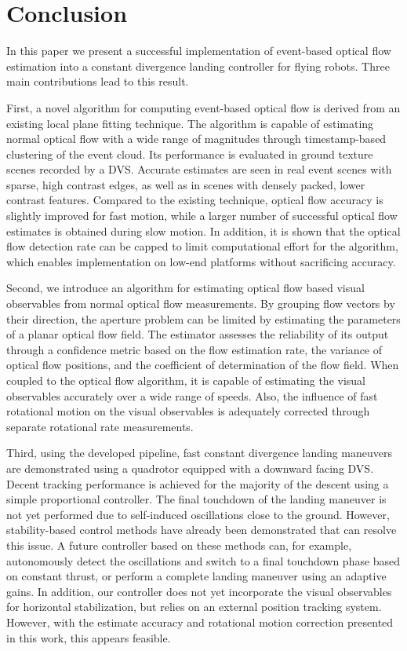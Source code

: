 \section{Conclusion}
\label{sec:conclusion}

In this paper we present a successful implementation of event-based optical flow estimation into a constant divergence landing controller for flying robots. Three main contributions lead to this result.

First, a novel algorithm for computing event-based optical flow is derived from an existing local plane fitting technique. The algorithm is capable of estimating normal optical flow with a wide range of magnitudes through timestamp-based clustering of the event cloud. Its performance is evaluated in ground texture scenes recorded by a DVS. Accurate estimates are seen in real event scenes with sparse, high contrast edges, as well as in scenes with densely packed, lower contrast features. Compared to the existing technique, optical flow accuracy is slightly improved for fast motion, while a larger number of successful optical flow estimates is obtained during slow motion. In addition, it is shown that the optical flow detection rate can be capped to limit computational effort for the algorithm, which enables implementation on low-end platforms without sacrificing accuracy.

Second, we introduce an algorithm for estimating optical flow based visual observables from normal optical flow measurements. By grouping flow vectors by their direction, the aperture problem can be limited by estimating the parameters of a planar optical flow field. The estimator assesses the reliability of its output through a confidence metric based on the flow estimation rate, the variance of optical flow positions, and the coefficient of determination of the flow field. When coupled to the optical flow algorithm, it is capable of estimating the visual observables accurately over a wide range of speeds. Also, the influence of fast rotational motion on the visual observables is adequately corrected through separate rotational rate measurements.

Third, using the developed pipeline, fast constant divergence landing maneuvers are demonstrated using a quadrotor equipped with a downward facing DVS. Decent tracking performance is achieved for the majority of the descent using a simple proportional controller. The final touchdown of the landing maneuver is not yet performed due to self-induced oscillations close to the ground. However, stability-based control methods have already been demonstrated that can resolve this issue. A future controller based on these methods can, for example, autonomously detect the oscillations and switch to a final touchdown phase based on constant thrust, or perform a complete landing maneuver using an adaptive gains. In addition, our controller does not yet incorporate the visual observables for horizontal stabilization, but relies on an external position tracking system. However, with the estimate accuracy and rotational motion correction presented in this work, this appears feasible.

